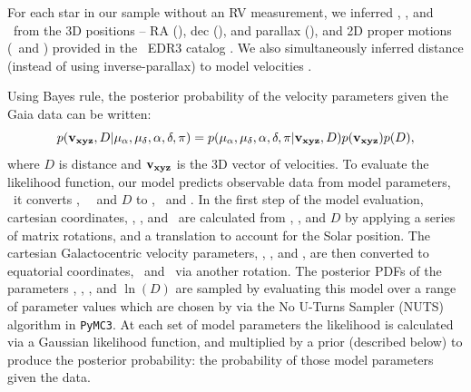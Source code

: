 For each star in our sample without an RV measurement, we inferred \vx, \vy,
and \vz\ from the 3D positions -- RA (\ra), dec (\dec), and parallax
(\parallax), and 2D proper motions (\mura\ and \mudec) provided in the \gaia\
EDR3 catalog \citep{gaia_edr3}.
We also simultaneously inferred distance (instead of using inverse-parallax)
to model velocities \citep[see \eg][]{bailer-jones2015, bailer-jones2018}.

Using Bayes rule, the posterior probability of the velocity parameters given
the Gaia data can be written:
\begin{equation}
    p({\bf v_{xyz}}, D | \mu_{\alpha}, \mu_{\delta}, \alpha, \delta, \pi) =
    p(\mu_{\alpha}, \mu_{\delta}, \alpha, \delta, \pi | {\bf v_{xyz}}, D)
    p({\bf v_{xyz}}) p(D),
\end{equation}
where $D$ is distance and ${\bf v_{xyz}}$ is the 3D vector of velocities.
To evaluate the likelihood function, our model predicts observable data from
model parameters, \ie\ it converts \vx, \vy\, \vz\ and $D$ to \pmra, \pmdec\
and \parallax.
In the first step of the model evaluation, cartesian coordinates, \x, \y, and
\z\, are calculated from \ra, \dec, and $D$ by applying a series of matrix
rotations, and a translation to account for the Solar position.
The cartesian Galactocentric velocity parameters, \vx, \vy, and \vz, are then
converted to equatorial coordinates, \pmra\ and \pmdec\ via another rotation.
The posterior PDFs of the parameters \vx, \vy, \vz, and $\ln(D)$ are sampled
by evaluating this model over a range of parameter values which are chosen by
via the No U-Turns Sampler (NUTS) algorithm in {\tt PyMC3}.
At each set of model parameters the likelihood is calculated via a Gaussian
likelihood function, and multiplied by a prior (described below) to produce
the posterior probability: the probability of those model parameters given the
data.

